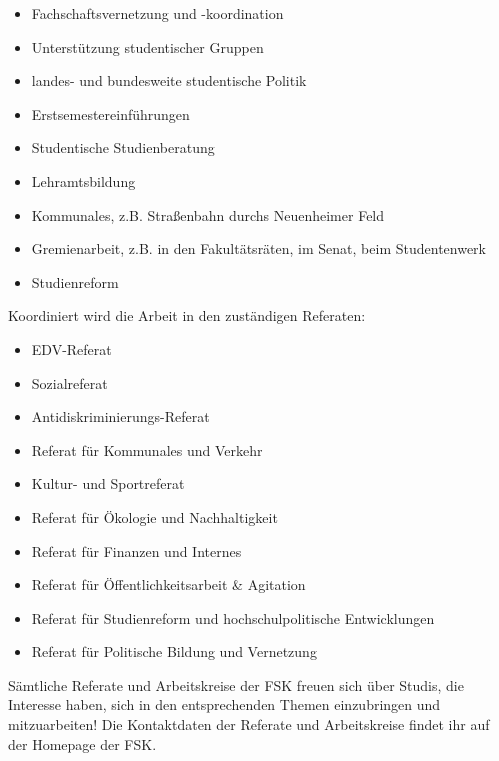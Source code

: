 \vspace{-0.6\baselineskip}
\begin{itemize}
 \addtolength{\itemsep}{-0.6\baselineskip}
 \item Fachschaftsvernetzung und -koordination
 \item Unterstützung studentischer Gruppen
 \item landes- und bundesweite studentische Politik
 \item Erstsemestereinführungen
 \item Studentische Studienberatung
 \item Lehramtsbildung
 \item Kommunales, z.B. Straßenbahn durchs Neuenheimer Feld
 \item Gremienarbeit, z.B. in den Fakultätsräten, im Senat, beim Studentenwerk
 \item Studienreform
\end{itemize}

Koordiniert wird die Arbeit in den zuständigen Referaten:

\vspace{-0.6\baselineskip}
\begin{itemize}
 \addtolength{\itemsep}{-0.6\baselineskip}
 \item EDV-Referat
 \item Sozialreferat
 \item Antidiskriminierungs-Referat
 \item Referat für Kommunales und Verkehr
 \item Kultur- und Sportreferat
 \item Referat für Ökologie und Nachhaltigkeit 
 \item Referat für Finanzen und Internes
 \item Referat für Öffentlichkeitsarbeit \& Agitation
 \item Referat für Studienreform und hochschulpolitische Entwicklungen
 \item Referat für Politische Bildung und Vernetzung
\end{itemize}

Sämtliche Referate und Arbeitskreise der FSK freuen sich über Studis, die Interesse haben, sich in den entsprechenden Themen einzubringen und mitzuarbeiten! Die Kontaktdaten der Referate und Arbeitskreise findet ihr auf der Homepage der \gls{FSK}.
